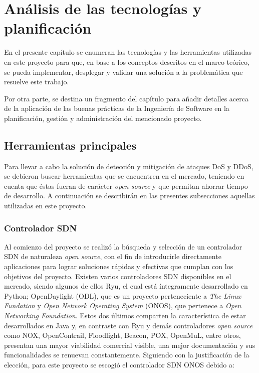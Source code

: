 \chapter{Análisis de las tecnologías y planificación} %

\label{Chapter3} %

En el presente capítulo se enumeran las tecnologías y las herramientas
utilizadas en este proyecto para que, en base a los conceptos descritos en el
marco teórico, se pueda implementar, desplegar y validar una solución a la
problemática que resuelve este trabajo.

Por otra parte, se destina un fragmento del capítulo para añadir detalles acerca de
la aplicación de las buenas prácticas de la Ingeniería de Software en la
planificación, gestión y administración del mencionado proyecto.

\section{Herramientas principales} \label{sec:hprincipales}

Para llevar a cabo la solución de detección y mitigación de ataques DoS y DDoS,
se debieron buscar herramientas que se encuentren en el mercado, teniendo en
cuenta que éstas fueran de carácter \textit{open source} y que permitan ahorrar tiempo de
desarrollo. A continuación se describirán en las presentes subsecciones aquellas
utilizadas en este proyecto.

\subsection {Controlador SDN}
Al comienzo del proyecto se realizó la búsqueda y selección de un controlador
SDN de naturaleza \textit{open source}, con el fin de introducirle directamente
aplicaciones para lograr soluciones rápidas y efectivas que cumplan con los
objetivos del proyecto. Existen varios controladores SDN disponibles en el
mercado, siendo algunos de ellos Ryu, el cual está íntegramente desarrollado en
Python; OpenDaylight (ODL), que es un proyecto perteneciente a \textit {The
  Linux Fundation} y \textit{Open Network Operating System} (ONOS), que
pertenece a \textit{Open Networking Foundation}. Estos dos últimos comparten la
característica de estar desarrollados en Java y, en contraste con Ryu y demás
controladores \textit{open source} como NOX, OpenContrail, Floodlight, Beacon,
POX, OpenMuL, entre otros, presentan una mayor viabilidad comercial visible, una
mejor documentación y sus funcionalidades se renuevan constantemente. Siguiendo
con la justificación de la elección, para este proyecto se escogió el
controlador SDN ONOS debido a:


